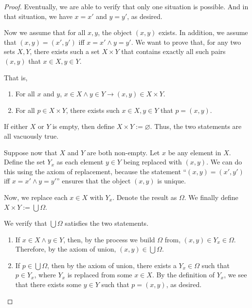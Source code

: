 \begin{proof}
	Eventually, we are able to verify that only one situation is possible. And in that situation, we have $x = x'$ and $y = y'$, as desired.
	
	 Now we assume that for all $x,y$, the object $(x,y)$ exists. In addition, we assume that $(x,y) = (x',y')$ iff $x = x' \wedge y = y'$. We want to prove that, for any two sets $X,Y$, there exists such a set $X \times Y$ that contains exactly all such pairs $(x,y)$ that $x \in X, y \in Y$.
	
	That is,
	\begin{enumerate}
		\item For all $x$ and $y$, $x \in X \wedge y \in Y \to (x,y) \in X \times Y$.
		\item For all $p \in X \times Y$, there exists such $x \in X, y \in Y$ that $p = (x,y)$.
	\end{enumerate}

	If either $X$ or $Y$ is empty, then define $X \times Y := \varnothing$. Thus, the two statements are all vacuously true.
	
	Suppose now that $X$ and $Y$ are both non-empty. Let $x$ be any element in $X$. Define the set $Y_x$ as each element $y \in Y$ being replaced with $(x,y)$. We can do this using the axiom of replacement, because the statement ``$(x,y) = (x',y')$ iff $x = x' \wedge y = y'$'' ensures that the object $(x,y)$ is unique.
	
	Now, we replace each $x \in X$ with $Y_x$. Denote the result as $\Omega$. We finally define $X\times Y := \bigcup \Omega$. 
	
	We verify that $\bigcup \Omega$ satisfies the two statements.
	\begin{enumerate}
		\item If $x \in X \wedge y \in Y$, then, by the process we build $\Omega$ from, $(x,y) \in Y_x \in \Omega$. Therefore, by the axiom of union, $(x,y) \in \bigcup \Omega$.
		\item If $p \in \bigcup \Omega$, then by the axiom of union, there exists a $Y_x \in \Omega$ such that $p \in Y_x$, where $Y_x$ is replaced from some $x \in X$. By the definition of $Y_x$, we see that there exists some $y \in Y$ such that $p = (x,y)$, as desired.
	\end{enumerate}
\end{proof}

